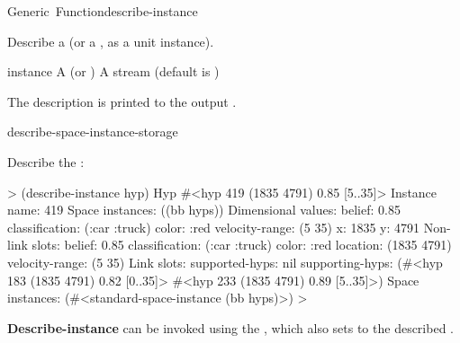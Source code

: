 \documentclass[10pt,twoside,english,pdftex]{article}
\begin{document}
\begin{functiondoc}{Generic~Function}{describe-instance}%
  {}
%
%
%

\fnsyntax

\fnpurpose Describe a  (or a
, as a unit instance).

\fnmethods
{}%
 {\code{(} 
     }

\fnpackage {}

\fnmodule {}

%
\fnargs
\begin{args}{instance}
\arg[instance] A  (or )
\arg[stream] A stream (default is )
\end{args}

\fndescription
The description is printed to the output .

\begin{alsos}{describe-space-instance-storage}
\end{alsos}

\fnexample
Describe the  :
%
\W\supp
\begin{example}
  > (describe-instance hyp)
  Hyp #<hyp 419 (1835 4791) 0.85 [5..35]>
    Instance name: 419
    Space instances: ((bb hyps))
    Dimensional values:
      belief:  0.85
      classification:  (:car :truck)
      color:  :red
      velocity-range:  (5 35)
      x:  1835
      y:  4791
    Non-link slots:
      belief:  0.85
      classification:  (:car :truck)
      color:  :red
      location:  (1835 4791)
      velocity-range:  (5 35)
    Link slots:
      supported-hyps:  nil
      supporting-hyps:  (#<hyp 183 (1835 4791) 0.82 [0..35]>
                         #<hyp 233 (1835 4791) 0.89 [5..35]>)
    Space instances: (#<standard-space-instance (bb hyps)>)
  >
\end{example}

\replnote 
%
%
%
\textbf{Describe-instance} can be invoked using the 
, which also sets \code{=} to the described .

\end{functiondoc}
\end{document}
